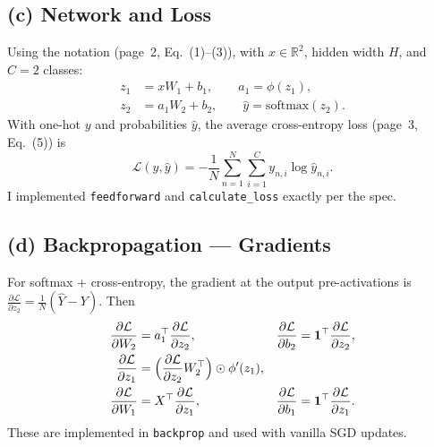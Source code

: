 \documentclass[11pt]{article}
\begin{document}
\subsection{(c) Network and Loss}
Using the notation (page~2, Eq.~(1)--(3)), with \(x\in\mathbb{R}^2\), hidden width \(H\), and \(C=2\) classes:
\begin{align}
z_1 &= x W_1 + b_1, \qquad a_1 = \phi(z_1),\\
z_2 &= a_1 W_2 + b_2, \qquad \hat{y} = \mathrm{softmax}(z_2).
\end{align}
With one-hot \(y\) and probabilities \(\hat{y}\), the average cross-entropy loss (page~3, Eq.~(5)) is
\begin{equation}
  \mathcal{L}(y,\hat{y}) = -\frac{1}{N}\sum_{n=1}^N \sum_{i=1}^C y_{n,i}\log \hat{y}_{n,i}.
\end{equation}
I implemented \verb|feedforward| and \verb|calculate_loss| exactly per the spec.

\subsection{(d) Backpropagation --- Gradients}
For softmax + cross-entropy, the gradient at the output pre-activations is
\(\frac{\partial \mathcal{L}}{\partial z_2} = \frac{1}{N}(\hat{Y}-Y)\).
Then
\begin{align}
\frac{\partial \mathcal{L}}{\partial W_2} &= a_1^\top \frac{\partial \mathcal{L}}{\partial z_2}, &
\frac{\partial \mathcal{L}}{\partial b_2} &= \mathbf{1}^\top \frac{\partial \mathcal{L}}{\partial z_2},\\
\frac{\partial \mathcal{L}}{\partial z_1} &= \Bigl(\frac{\partial \mathcal{L}}{\partial z_2} W_2^\top\Bigr)\odot \phi'(z_1),\\
\frac{\partial \mathcal{L}}{\partial W_1} &= X^\top \frac{\partial \mathcal{L}}{\partial z_1}, &
\frac{\partial \mathcal{L}}{\partial b_1} &= \mathbf{1}^\top \frac{\partial \mathcal{L}}{\partial z_1}.
\end{align}
These are implemented in \verb|backprop| and used with vanilla SGD updates.
\end{document}
